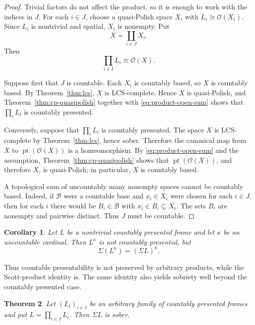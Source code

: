 \documentclass[11pt,reqno]{amsart}
\newtheorem{theorem}{Theorem}[section]
\newtheorem{corollary}[theorem]{Corollary}
\theoremstyle{definition}
\numberwithin{equation}{section}
\newcommand{\OO}{\mathcal O}
\newcommand{\pt}{\operatorname{pt}}
\begin{document}
\begin{proof}
Trivial factors do not affect the product, so it is enough to work with the
indices in $J$.  For each $i\in J$, choose a quasi-Polish space $X_i$ with
$L_i\cong\OO(X_i)$.  Since $L_i$ is nontrivial and spatial, $X_i$ is
nonempty.  Put
\[
  X=\coprod_{i\in J}X_i.
\]
Then
\begin{equation}\label{eq:product-open-sum}
  \prod_{i\in I}L_i\cong\OO(X).
\end{equation}

Suppose first that $J$ is countable.  Each $X_i$ is countably based, so $X$
is countably based.  By Theorem~\ref{thm:lcs}, $X$ is LCS-complete.  Hence
$X$ is quasi-Polish, and Theorem~\ref{thm:cp-quasipolish} together with
\eqref{eq:product-open-sum} shows that $\prod_iL_i$ is countably presented.

Conversely, suppose that $\prod_iL_i$ is countably presented.  The space $X$
is LCS-complete by Theorem~\ref{thm:lcs}, hence sober.  Therefore the
canonical map from $X$ to $\pt(\OO(X))$ is a homeomorphism.  By
\eqref{eq:product-open-sum} and the assumption, Theorem~\ref{thm:cp-quasipolish}
shows that $\pt(\OO(X))$, and therefore $X$, is quasi-Polish; in particular,
$X$ is countably based.

A topological sum of uncountably many nonempty spaces cannot be countably
based.  Indeed, if $\mathcal B$ were a countable base and $x_i\in X_i$ were
chosen for each $i\in J$, then for each $i$ there would be
$B_i\in\mathcal B$ with $x_i\in B_i\subseteq X_i$.  The sets $B_i$ are
nonempty and pairwise distinct.  Thus $J$ must be countable.
\end{proof}

\begin{corollary}\label{cor:uncountable-power-notcp}
Let $L$ be a nontrivial countably presented frame and let $\kappa$ be an
uncountable cardinal.  Then $L^\kappa$ is not countably presented, but
\[
  \Sigma(L^\kappa)=(\Sigma L)^\kappa.
\]
\end{corollary}

Thus countable presentability is not preserved by arbitrary products, while
the Scott-product identity is.  The same identity also yields sobriety well
beyond the countably presented case.

\begin{theorem}\label{thm:product-sober}
Let $(L_i)_{i\in I}$ be an arbitrary family of countably presented frames and
put $L=\prod_{i\in I}L_i$.  Then $\Sigma L$ is sober.
\end{theorem}
\end{document}
